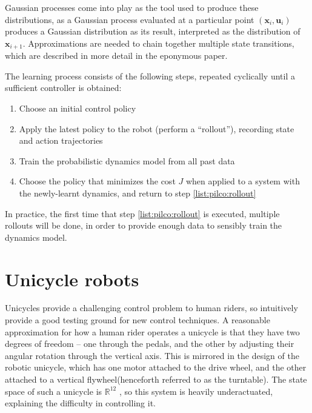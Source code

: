 \documentclass[main.tex]{subfiles}
\begin{document}
	Gaussian processes come into play as the tool used to produce these distributions, as a Gaussian process evaluated at a particular point $(\bm{x}_i,\bm{u}_i)$ produces a Gaussian distribution as its result, interpreted as the distribution of $\bm{x}_{i+1}$. Approximations are needed to chain together multiple state transitions, which are described in more detail in the eponymous paper\cite{pilco}.

	The learning process consists of the following steps, repeated cyclically until a sufficient controller is obtained:
	\begin{enumerate}[nosep]
		\item Choose an initial control policy
		\item Apply the latest policy to the robot (perform a \enquote{rollout}), recording state and action trajectories \label{list:pilco:rollout}
		\item Train the probabilistic dynamics model from all past data
		\item Choose the policy that minimizes the cost $J$ when applied to a system with the newly-learnt dynamics, and return to step \ref{list:pilco:rollout}
	\end{enumerate}
	In practice, the first time that step \ref{list:pilco:rollout} is executed, multiple rollouts will be done, in order to provide enough data to sensibly train the dynamics model.



\section{Unicycle robots}

	Unicycles provide a challenging control problem to human riders, so intuitively provide a good testing ground for new control techniques.
	A reasonable approximation for how a human rider operates a unicycle is that they have two degrees of freedom -- one through the pedals, and the other by adjusting their angular rotation through the vertical axis.
	This is mirrored in the design of the robotic unicycle, which has one motor attached to the drive wheel, and the other attached to a vertical flywheel\footnotemark (henceforth referred to as the turntable).
	The state space of such a unicycle is $\mathbb{R}^{12}$ \cite{forster}, so this system is heavily underactuated, explaining the difficulty in controlling it.

\end{document}
